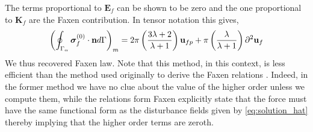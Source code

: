 The terms proportional to $\textbf{E}_f$ can be shown to be zero and the one proportional to $\textbf{K}_f$ are the Faxen contribution. 
In tensor notation this gives, 
\begin{align*}
    \left(
        \oint_{\Gamma_{\alpha}} \bm\sigma_f^{(0)} \cdot \textbf{n} d\Gamma
    \right)_m
    = 
     2\pi\left(\frac{3\lambda +2 }{\lambda +1}\right)
    \textbf{u}_{fp}  
    + \pi \left(\frac{\lambda }{\lambda +1}\right)\partial^2 \textbf{u}_f
\end{align*}
We thus recovered Faxen law. 
Note that this method, in this context, is less efficient than the method used originally to derive the Faxen relations \citet{kim2013microhydrodynamics}. 
Indeed, in the former method we have no clue about the value of the higher order unless we compute them, while the relations form Faxen explicitly state that the force must have the same functional form as the disturbance fields given by \ref{eq:solution_hat} thereby implying that the higher order terms are zeroth. 



